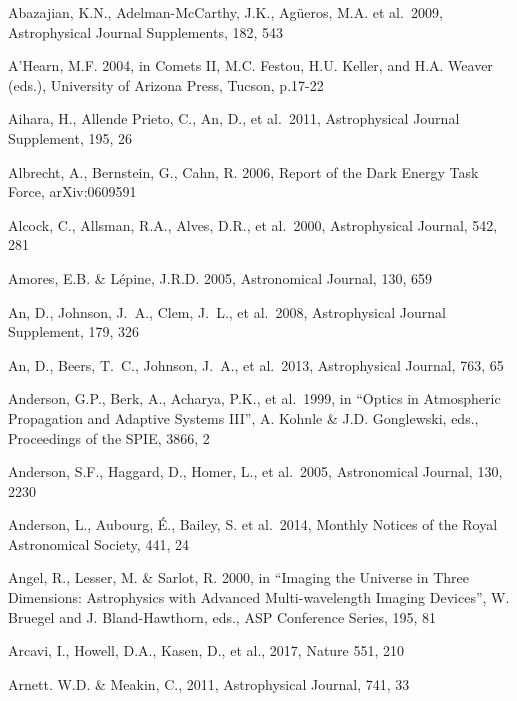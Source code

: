 \documentclass{emulateapj}
\begin{document}
\vskip 0.3in
\begin{thebibliography}{}

\bibitem[()]{} Abazajian, K.N., Adelman-McCarthy, J.K., Ag\"ueros,
  M.A. et al.~2009, Astrophysical Journal Supplements, 182, 543

\bibitem[()]{} A'Hearn, M.F. 2004, in Comets II, M.C. Festou, H.U. Keller, and H.A. Weaver (eds.),
             University of  Arizona Press, Tucson, p.17-22

\bibitem[()]{} Aihara, H., Allende Prieto, C., An, D., et al.~2011,
  Astrophysical Journal Supplement, 195, 26


\bibitem[()]{} Albrecht, A., Bernstein, G., Cahn, R. 2006, Report of
  the Dark Energy Task Force, arXiv:0609591

\bibitem[()]{} Alcock, C., Allsman, R.A., Alves, D.R., et al.~2000, Astrophysical Journal, 542, 281

\bibitem[()]{} Amores, E.B. \& L\'{e}pine, J.R.D. 2005, Astronomical Journal, 130, 659

\bibitem[()]{} An, D., Johnson, J.~A., Clem, J.~L., et al.~2008, Astrophysical Journal Supplement, 179, 326

\bibitem[()]{} An, D., Beers, T.~C., Johnson, J.~A., et al.~2013, Astrophysical Journal, 763, 65

\bibitem[()]{} Anderson, G.P., Berk, A., Acharya, P.K., et al.~1999, in ``Optics in
             Atmospheric Propagation and Adaptive Systems III'',  A. Kohnle \& J.D. Gonglewski,
             eds., Proceedings of the SPIE, 3866, 2

\bibitem[()]{} Anderson, S.F., Haggard, D., Homer, L., et al.~2005, Astronomical Journal, 130, 2230

\bibitem[()]{} Anderson, L., Aubourg, \'E., Bailey, S. et al.~2014,
  Monthly Notices of the Royal Astronomical Society, 441, 24

\bibitem[()]{} Angel, R., Lesser, M. \& Sarlot, R. 2000, in  ``Imaging the Universe in Three
             Dimensions: Astrophysics with Advanced Multi-wavelength Imaging Devices'',
             W. Bruegel and J. Bland-Hawthorn, eds., ASP Conference Series, 195, 81

\bibitem[()]{} Arcavi, I., Howell, D.A., Kasen, D., et al., 2017, Nature 551, 210

\bibitem[()]{} Arnett. W.D. \& Meakin, C., 2011, Astrophysical Journal, 741, 33


\end{thebibliography}
\end{document}
